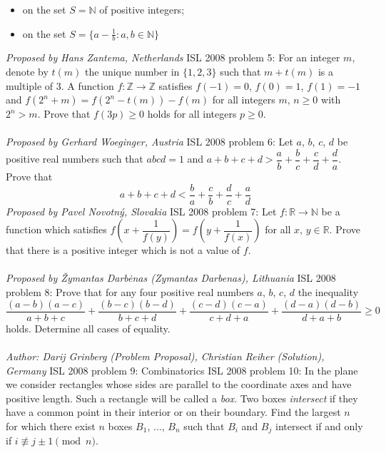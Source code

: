 \begin{itemize}
  \item on the set $ S = \mathbb{N}$ of positive integers;
  \item on the set $ S = \{a - \frac {1}{b}: a, b\in\mathbb{N}\}$
\end{itemize}
\textit{Proposed by Hans Zantema, Netherlands} 
ISL 2008 problem 5:  For an integer $ m$, denote by $ t(m)$ the unique number in $ \{1, 2, 3\}$ such that $ m + t(m)$ is a multiple of $ 3$. A function $ f: \mathbb{Z}\to\mathbb{Z}$ satisfies $ f( - 1) = 0$, $ f(0) = 1$, $ f(1) = - 1$ and $ f\left(2^n + m\right) = f\left(2^n - t(m)\right) - f(m)$ for all integers $ m$, $ n\ge 0$ with $ 2^n > m$. Prove that $ f(3p)\ge 0$ holds for all integers $ p\ge 0$. \\\\
\textit{Proposed by Gerhard Woeginger, Austria} 
ISL 2008 problem 6:  Let $ a$, $ b$, $ c$, $ d$ be positive real numbers such that $ abcd = 1$ and $ a + b + c + d > \dfrac{a}{b} + \dfrac{b}{c} + \dfrac{c}{d} + \dfrac{d}{a}$. Prove that
\[ a + b + c + d < \dfrac{b}{a} + \dfrac{c}{b} + \dfrac{d}{c} + \dfrac{a}{d} \]
\textit{Proposed by Pavel Novotný, Slovakia} 
ISL 2008 problem 7:  Let $ f: \mathbb{R}\to\mathbb{N}$ be a function which satisfies $ f\left(x + \dfrac{1}{f(y)}\right) = f\left(y + \dfrac{1}{f(x)}\right)$ for all $ x$, $ y\in\mathbb{R}$. Prove that there is a positive integer which is not a value of $ f$. \\\\
\textit{Proposed by Žymantas Darbėnas (Zymantas Darbenas), Lithuania} 
ISL 2008 problem 8:  Prove that for any four positive real numbers $ a$, $ b$, $ c$, $ d$ the inequality
\[
\frac {(a - b)(a - c)}{a + b + c} + \frac {(b - c)(b - d)}{b + c + d} + \frac {(c - d)(c - a)}{c + d + a} + \frac {(d - a)(d - b)}{d + a + b}\ge 0
\]
holds. Determine all cases of equality. \\\\
\textit{Author: Darij Grinberg (Problem Proposal), Christian Reiher (Solution), Germany} 
ISL 2008 problem 9:  Combinatorics 
ISL 2008 problem 10:  In the plane we consider rectangles whose sides are parallel to the coordinate axes and have positive length. Such a rectangle will be called a \textit{box}. Two boxes \textit{intersect} if they have a common point in their interior or on their boundary. Find the largest $ n$ for which there exist $ n$ boxes $ B_1$, $ \ldots$, $ B_n$ such that $ B_i$ and $ B_j$ intersect if and only if $ i\not\equiv j\pm 1\pmod n$. \\\\
